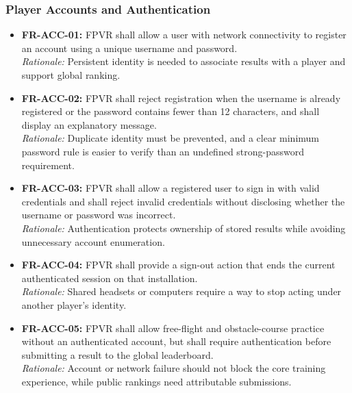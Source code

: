 \documentclass[12pt]{article}
\begin{document}
\subsubsection{Player Accounts and Authentication}
\label{sec:s2-accounts}
\begin{itemize}
\item \hypertarget{req:FR-ACC-01}{}\textbf{FR-ACC-01:} FPVR shall allow a user with network connectivity to register an account using a unique username and password.\\
\textit{Rationale:} Persistent identity is needed to associate results with a player and support global ranking.
\item \hypertarget{req:FR-ACC-02}{}\textbf{FR-ACC-02:} FPVR shall reject registration when the username is already registered or the password contains fewer than 12 characters, and shall display an explanatory message.\\
\textit{Rationale:} Duplicate identity must be prevented, and a clear minimum password rule is easier to verify than an undefined strong-password requirement.
\item \hypertarget{req:FR-ACC-03}{}\textbf{FR-ACC-03:} FPVR shall allow a registered user to sign in with valid credentials and shall reject invalid credentials without disclosing whether the username or password was incorrect.\\
\textit{Rationale:} Authentication protects ownership of stored results while avoiding unnecessary account enumeration.
\item \hypertarget{req:FR-ACC-04}{}\textbf{FR-ACC-04:} FPVR shall provide a sign-out action that ends the current authenticated session on that installation.\\
\textit{Rationale:} Shared headsets or computers require a way to stop acting under another player's identity.
\item \hypertarget{req:FR-ACC-05}{}\textbf{FR-ACC-05:} FPVR shall allow free-flight and obstacle-course practice without an authenticated account, but shall require authentication before submitting a result to the global leaderboard.\\
\textit{Rationale:} Account or network failure should not block the core training experience, while public rankings need attributable submissions.
\end{itemize}
\end{document}
